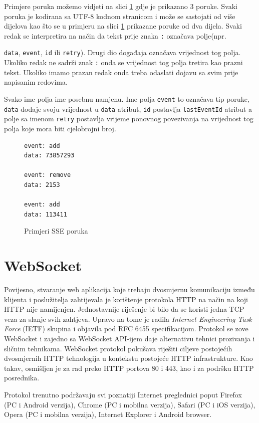 \documentclass[times, utf8, zavrsni]{fer}
\begin{document}
Primjere poruka možemo vidjeti na slici \ref{lst:sse-messages} gdje je prikazano 3 poruke. Svaki poruka je kodirana sa UTF-8 kodnom stranicom i može se sastojati od više dijelova kao što se u primjeru na slici \ref{lst:sse-messages} prikazane poruke od dva dijela. Svaki redak se interpretira na način da tekst prije znaka {\tt :} označava polje(npr. {{\tt data}, {\tt event}, {\tt id} ili {\tt retry}). Drugi dio događaja označava vrijednost tog polja. Ukoliko redak ne sadrži znak {\tt :} onda se vrijednost tog polja tretira kao prazni tekst. Ukoliko imamo prazan redak onda treba odaslati dojavu sa svim prije napisanim redovima.

Svako ime polja ime posebnu namjenu. Ime polja {\tt event} to označava tip poruke, {\tt data} dodaje svoju vrijednost u {\tt data} atribut, {\tt id} postavlja {\tt lastEventId} atribut a polje sa imenom {\tt retry} postavlja vrijeme ponovnog povezivanja na vrijednost tog polja koje mora biti cjelobrojni broj.\citep{sse2017}

\begin{figure}
\begin{lstlisting}
event: add
data: 73857293

event: remove
data: 2153

event: add
data: 113411
\end{lstlisting}
\caption{Primjeri SSE poruka}
\label{lst:sse-messages}
\end{figure}

\section{WebSocket}
Povijesno, stvaranje web aplikacija koje trebaju dvosmjernu komunikaciju između klijenta i poslužitelja zahtijevala je korištenje protokola HTTP na način na koji HTTP nije namijenjen. Jednostavnije riješenje bi bilo da se koristi jedna TCP veza za slanje svih zahtjeva. Upravo na tome je radila {\em Internet Engineering Task Force} (IETF) skupina i objavila pod RFC 6455 specifikacijom. Protokol se zove WebSocket i zajedno sa WebSocket API-ijem daje alternativu tehnici prozivanja i sličnim tehnikama. WebSocket protokol pokušava riješiti ciljeve postojećih dvosmjernih HTTP tehnologija u kontekstu postojeće HTTP infrastrukture. Kao takav, osmišljen je za rad preko HTTP portova 80 i 443, kao i za podršku HTTP posrednika.

Protokol trenutno podržavaju svi poznatiji Internet preglednici poput Firefox (PC i Android verzija), Chrome (PC i mobilna verzija), Safari (PC i iOS verzija), Opera (PC i mobilna verzija), Internet Explorer i Android browser.

}
\end{document}
